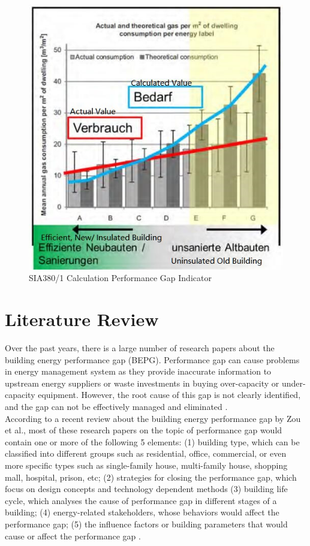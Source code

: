 \documentclass[a4paper, oneside]{discothesis}
\begin{document}
		\begin{figure}[!ht]
		\centering
		\includegraphics[scale=0.65]{SIA380Issue.jpg}
		\caption{SIA380/1 Calculation Performance Gap Indicator \cite{SIAPreviousreport}}
		\label{fig:SIA380PG}
		\end{figure}


\chapter{Literature Review}
	Over the past years, there is a large number of research papers about the building energy performance gap (BEPG). Performance gap can cause problems in energy management system as they provide inaccurate information to upstream energy suppliers or waste investments in buying over-capacity or under-capacity equipment. However, the root cause of this gap is not clearly identified, and the gap can not be effectively managed and eliminated \cite{FREI2017421}.\\
	
	According to a recent review about the building energy performance gap by Zou et al.\cite{ZOU2018165}, most of these research papers on the topic of performance gap would contain one or more of the following 5 elements: (1) building type, which can be classified into different groups such as residential, office, commercial, or even more specific types such as single-family house, multi-family house, shopping mall, hospital, prison, etc; (2) strategies for closing the performance gap, which focus on design concepts and technology dependent methods (3) building life cycle, which analyses the cause of performance gap in different stages of a building; (4) energy-related stakeholders, whose behaviors would affect the performance gap; (5) the influence factors or building parameters that would cause or affect the performance gap \cite{FREI2017421,ZOU2018165}.\\
	
\end{document}
